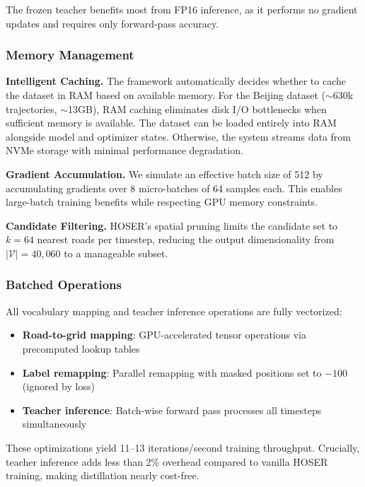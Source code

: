 The frozen teacher benefits most from FP16 inference, as it performs no gradient updates and requires only forward-pass accuracy.

\subsubsection{Memory Management}

\textbf{Intelligent Caching.} The framework automatically decides whether to cache the dataset in RAM based on available memory. For the Beijing dataset ($\sim$630k trajectories, $\sim$13GB), RAM caching eliminates disk I/O bottlenecks when sufficient memory is available. The dataset can be loaded entirely into RAM alongside model and optimizer states. Otherwise, the system streams data from NVMe storage with minimal performance degradation.

\textbf{Gradient Accumulation.} We simulate an effective batch size of 512 by accumulating gradients over 8 micro-batches of 64 samples each. This enables large-batch training benefits while respecting GPU memory constraints.

\textbf{Candidate Filtering.} HOSER's spatial pruning limits the candidate set to $k = 64$ nearest roads per timestep, reducing the output dimensionality from $|\mathcal{V}| = 40{,}060$ to a manageable subset.

\subsubsection{Batched Operations}

All vocabulary mapping and teacher inference operations are fully vectorized:

\begin{itemize}[noitemsep,topsep=0pt]
\item \textbf{Road-to-grid mapping}: GPU-accelerated tensor operations via precomputed lookup tables
\item \textbf{Label remapping}: Parallel remapping with masked positions set to $-100$ (ignored by loss)
\item \textbf{Teacher inference}: Batch-wise forward pass processes all timesteps simultaneously
\end{itemize}

These optimizations yield 11--13 iterations/second training throughput. Crucially, teacher inference adds less than 2\% overhead compared to vanilla HOSER training, making distillation nearly cost-free.


